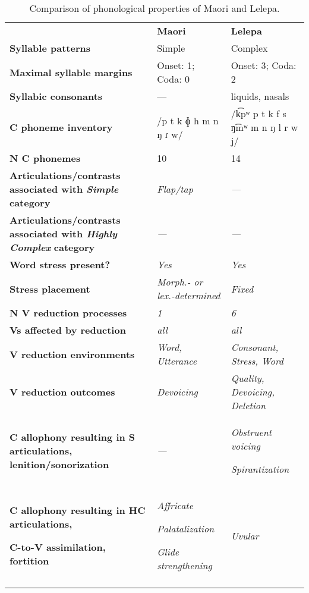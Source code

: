 \begin{table}
\begin{tabularx}{\textwidth}{XXX}
\lsptoprule
 & \textbf{Maori} & \textbf{Lelepa}\\
 \textbf{Syllable patterns} & Simple & Complex\\
 \textbf{Maximal syllable margins} & Onset: 1; Coda: 0 & Onset: 3; Coda: 2\\
 \textbf{Syllabic consonants} & — & liquids, nasals\\
 \textbf{C phoneme inventory} & /p t k ɸ h m n ŋ ɾ w/ & /k͡pʷ p t k f s ŋ͡mʷ m n ŋ l r w j/\\
 \textbf{N C phonemes} & 10 & 14\\
 \textbf{Articulations/contrasts associated with \textit{Simple}} \textbf{category} & \textit{Flap/tap} & \textit{—}\\
 \textbf{Articulations/contrasts associated with \textit{Highly Complex}} \textbf{category} & \textit{—} & \textit{—}\\
 \textbf{Word stress present?} & \textit{Yes} & \textit{Yes}\\
 \textbf{Stress placement} & \textit{Morph.- or lex.-determined} & \textit{Fixed}\\
 \textbf{N V reduction processes} & \textit{1} & \textit{6}\\
 \textbf{Vs affected by reduction}  & \textit{all} & \textit{all}\\
 \textbf{V reduction environments} & \textit{Word, Utterance} & \textit{Consonant, Stress, Word}\\
 \textbf{V reduction outcomes} & \textit{Devoicing} & \textit{Quality, Devoicing, Deletion}\\
 \textbf{C allophony resulting in S articulations, lenition/sonorization} & \textit{—} & { \textit{Obstruent voicing}}

 \textit{Spirantization}\\
{ \textbf{C allophony resulting in HC articulations,} }

 \textbf{C-to-V assimilation, fortition} & { \textit{Affricate}}

{ \textit{Palatalization}}

 \textit{Glide strengthening} & \textit{Uvular}\\
\lspbottomrule
\end{tabularx}
\caption{\label{tab:8.7}Comparison of phonological properties of Maori and Lelepa.}
\end{table}

